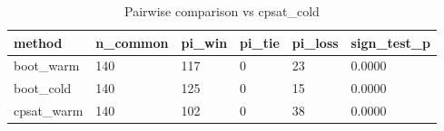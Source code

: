 \begin{table}[t]
\centering
\begin{tabular}{llllll}
\toprule
method & n\_common & pi\_win & pi\_tie & pi\_loss & sign\_test\_p \\
\midrule
boot\_warm & 140 & 117 & 0 & 23 & 0.0000 \\
boot\_cold & 140 & 125 & 0 & 15 & 0.0000 \\
cpsat\_warm & 140 & 102 & 0 & 38 & 0.0000 \\
\bottomrule
\end{tabular}
\caption{Pairwise comparison vs cpsat_cold}
\label{tab:ablation}
\end{table}

